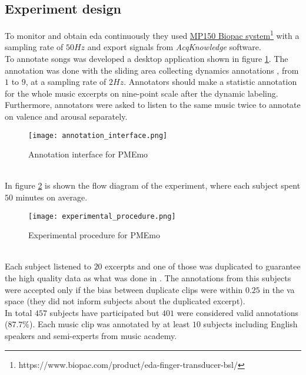 \subsection{Experiment design}
To monitor and obtain \gls{eda} continuously they used \href{https://www.biopac.com/product/eda-finger-transducer-bsl/}{MP150 Biopac system}\footnote{https://www.biopac.com/product/eda-finger-transducer-bsl/} with a sampling rate of $50Hz$ and export signals from \textit{AcqKnowledge} software.
\\
To annotate songs was developed a desktop application shown in figure \ref{fig:annotation_interface}. The annotation was done with the sliding area collecting dynamics annotations , from $1$ to $9$, at a sampling rate of $2Hz$. Annotators should make a statistic annotation for the whole music excerpts on nine-point scale after the dynamic labeling. Furthermore, annotators were asked to listen to the same music twice to annotate on valence and arousal separately.
\begin{figure}[h]
    \centering
    \texttt{[image: annotation\_interface.png]} 
	\caption{Annotation interface for PMEmo}
    \label{fig:annotation_interface}
\end{figure}
\\
In figure \ref{fig:experimental_procedure} is shown the flow diagram of the experiment, where each subject spent $50$ minutes on average.
\begin{figure}[h]
    \centering
    \texttt{[image: experimental\_procedure.png]} 
	\caption{Experimental procedure for PMEmo}
    \label{fig:experimental_procedure}
\end{figure}
\\
Each subject listened to $20$ excerpts and one of those was duplicated to guarantee the high quality data as what was done in \cite{chen2015amg1608}. The annotations from this subjects were accepted only if the bias between duplicate clips were within $0.25$ in the \gls{va} space (they did not inform subjects about the duplicated excerpt).
\\
In total $457$ subjects have participated but $401$ were considered valid annotations ($87.7\%$). Each music clip was annotated by at least $10$ subjects including English speakers and semi-experts from music academy.

